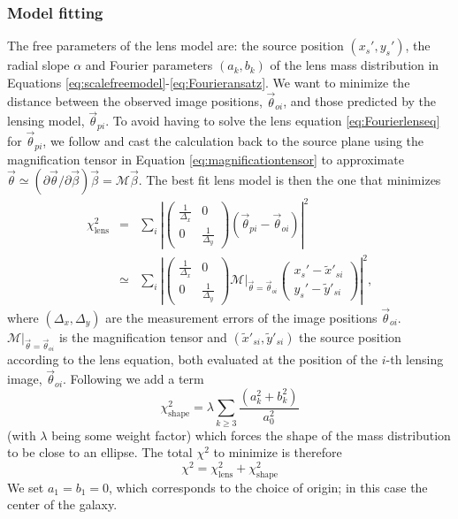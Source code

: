 \documentclass[useAMS,usenatbib]{mnras}
\newcommand{\vect}[1]{\vec{#1}} %
\begin{document}
\subsubsection{Model fitting}

The free parameters of the lens model are: the source position $(x_s',y_s')$, the radial slope $\alpha$ and Fourier parameters $(a_k,b_k)$ of the lens mass distribution in Equations \eqref{eq:scalefreemodel}-\eqref{eq:Fourieransatz}. We want to minimize the distance between the observed image positions, $\vect{\theta}_{oi}$, and those predicted by the lensing model, $\vect{\theta}_{pi}$. To avoid having to solve the lens equation \eqref{eq:Fourierlenseq} for $\vect{\theta}_{pi}$, we follow \citet{1991ApJ...373..354K} and cast the calculation back to the source plane using the magnification tensor in Equation \eqref{eq:magnificationtensor} to approximate $\vect{\theta} \simeq (\partial \vect{\theta} / \partial \vect{\beta}) \vect{\beta} = \mathscr{M} \vect{\beta} $. The best fit lens model is then the one that minimizes
\begin{eqnarray}
\chi^2_\text{lens} &=& \sum_{i} \left|\left( \begin{matrix} \frac{1}{\Delta_x} & 0\\0 & \frac{1}{\Delta_y}\end{matrix}\right) \left( \vect{\theta}_{pi} - \vect{\theta}_{oi} \right)\right|^2\nonumber\\
&\simeq& \sum_{i} \left|\left( \begin{matrix} \frac{1}{\Delta_x} & 0\\0 & \frac{1}{\Delta_y}\end{matrix}\right)  \left.\mathscr{M}\right|_{\vect{\theta}=\vect{\theta}_{oi}} \left( \begin{matrix} x_s' - \tilde{x}'_{si} \\ y_s' - \tilde{y}'_{si} \end{matrix} \right) \right|^2,\label{eq:chi2lens}
\end{eqnarray}
where $(\Delta_x,\Delta_y)$ are the measurement errors of the image positions $\vect{\theta}_{oi}$. $\left.\mathscr{M}\right|_{\vect{\theta}=\vect{\theta}_{oi}}$ is the magnification tensor and $(\tilde{x}'_{si},\tilde{y}'_{si})$ the source position according to the lens equation, both evaluated at the position of the $i$-th lensing image, $\vect{\theta}_{oi}$. Following \citet{GlennEC} we add a term
\begin{equation}
\chi^2_\text{shape} = \lambda \sum_{k \geq 3} \frac{\left(a_k^2 +b_k^2 \right)}{a_0^2} \label{eq:chi2shape}
\end{equation}
(with $\lambda$ being some weight factor) which forces the shape of the mass distribution to be close to an ellipse. The total $\chi^2$ to minimize is therefore
\begin{equation}
\chi^2 = \chi^2_\text{lens} + \chi^2_\text{shape} \label{eq:chi2total}
\end{equation}
We set $a_1 = b_1 = 0$, which corresponds to the choice of origin; in this case the center of the galaxy.
\end{document}

